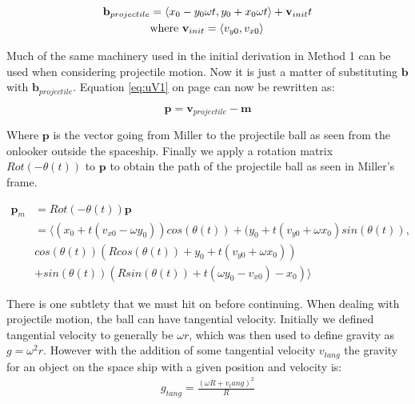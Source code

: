\documentclass{amsart}
\renewcommand{\vec}{\textbf}
\theoremstyle{definition}
\begin{document}
\begin{equation}\label{eq:BallProjectile}
\begin{split}
     \vec{b}_{projectile} &= \langle x_0 - y_0 \omega t, y_0 + x_0 \omega t \rangle + \vec{v}_{init}t \\ 
     &\textnormal{where } \vec{v}_{init} = \langle v_{y0},v_{x0} \rangle
\end{split}
\end{equation}

Much of the same machinery used in the initial derivation in Method 1
can be used when considering projectile motion. Now it is just a
matter of substituting $\vec{b}$ with $\vec{b}_{projectile}$. Equation
\ref{eq:uV1} on page \pageref{eq:uV1} can now be rewritten as:

\begin{equation}
    \vec{p} = \vec{v}_{projectile} - \vec{m}
\end{equation}

Where $\vec{p}$ is the vector going from Miller to the projectile ball
as seen from the onlooker outside the spaceship. Finally we apply a
rotation matrix $Rot(-\theta(t))$ to $\vec{p}$ to obtain the path of
the projectile ball as seen in Miller's frame.

\begin{equation}\label{eq:ProjectileMillerFrame}
\begin{split}
    \vec{p}_m &= Rot(-\theta(t))\vec{p} \\
    &= \langle (x_0 + t(v_{x0} - \omega y_0)) cos(\theta(t)) + (y_0 +t(v_{y0} + \omega x_0) sin(\theta(t)),\\
    & cos(\theta(t)) (R cos(\theta(t)) + y_0 + t(v_{y0} + \omega x_0)) \\
    &+ sin(\theta(t))(R sin(\theta(t)) + t(\omega y_0 - v_{x0})-x_0) \rangle
\end{split}
\end{equation}

There is one subtlety that we must hit on before continuing. When
dealing with projectile motion, the ball can have tangential
velocity. Initially we defined tangential velocity to generally be
$\omega r$, which was then used to define gravity as $g = \omega^2 r$.
However with the addition of some tangential velocity $v_{tang}$ the
gravity for an object on the space ship with a given position and
velocity is:
\begin{equation}\label{eq:TangentGravity}
\begin{split}
    g_{tang} = \frac{(\omega R + v_tang)^2}{R}
\end{split}
\end{equation}
\end{document}
